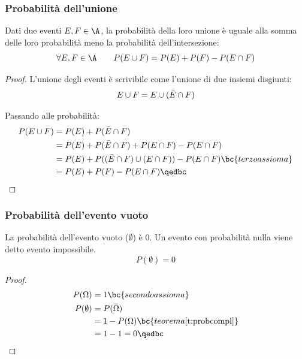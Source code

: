 \subsubsection{Probabilità dell'unione}
\begin{teor} \label{t:probunion}
	Dati due eventi $E,F\in\A$, la probabilità della loro unione è uguale alla somma delle loro probabilità meno la probabilità dell'intersezione:
	\begin{equation*}
		\forall E,F \in\A\qquad P(E\cup F)=P(E)+P(F)-P(E\cap F)
	\end{equation*}
\end{teor}
\begin{proof}
	L'unione degli eventi è scrivibile come l'unione di due insiemi disgiunti:
	\begin{equation*}
		E\cup F=E \cup (\bar E\cap F) \\[1ex]
	\end{equation*}

	Passando alle probabilità:
	\begin{align*}
		P(E\cup F) & = P(E)+P(\bar E\cap F)                                               \\
		           & = P(E)+P(\bar E\cap F)+P(E\cap F)-P(E\cap F)                         \\
		           & = P(E)+P((\bar E\cap F)\cup (E\cap F))-P(E\cap F) \bc{terzo assioma} \\
		           & = P(E)+P(F)-P(E\cap F)                            \qedbc
	\end{align*}
\end{proof}

\subsubsection{Probabilità dell'evento vuoto}
La probabilità dell'evento vuoto ($\emptyset$) è $0$. Un evento con probabilità nulla viene detto evento impossibile.
\begin{equation*}
	P(\emptyset)=0
\end{equation*}

\begin{proof}
	\begin{align*}
		P(\Omega)    & = 1 \bc{secondo assioma}                       \\
		P(\emptyset) & = P(\bar\Omega)                                \\
		             & = 1 - P(\Omega) \bc{teorema \ref{t:probcompl}} \\
		             & = 1 - 1 = 0     \qedbc
	\end{align*}
\end{proof}



